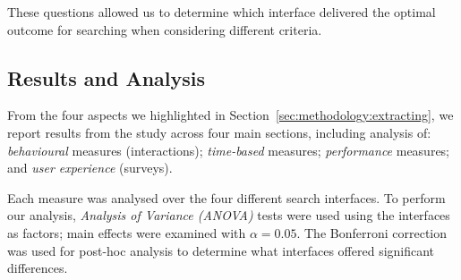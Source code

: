 These questions allowed us to determine which interface delivered the optimal outcome for searching when considering different criteria.

\subsection{Results and Analysis}\label{chap:snippets:user:results}
From the four aspects we highlighted in Section~\ref{sec:methodology:extracting}, we report results from the study across four main sections, including analysis of: \emph{behavioural} measures (interactions); \emph{time-based} measures; \emph{performance} measures; and \emph{user experience} (surveys).


Each measure was analysed over the four different search interfaces. To perform our analysis, \emph{Analysis of Variance (ANOVA)} tests were used using the interfaces as factors; main effects were examined with $\alpha = 0.05$. The Bonferroni correction was used for post-hoc analysis to determine what interfaces offered significant differences.

